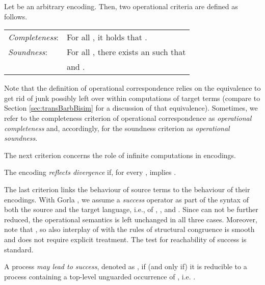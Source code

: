 \documentclass[]{llncs}
\begin{document}
\begin{definition}
\label{def:operationalCorrespondence}
	Let  be an arbitrary encoding.  Then, two operational criteria are defined as follows. 
        \begin{center}
          \begin{tabular}{ll}
            \emph{Completeness}: & For all , it holds that .\\
            \emph{Soundness}: & For all , there exists an  such that\\
            &  and .
          \end{tabular}
        \end{center}
\end{definition}

\noindent
Note that the definition of operational correspondence relies on the
equivalence  to get rid of junk possibly left over within
computations of target terms (compare to Section \ref{sec:transBarbBisim} for a discussion of that equivalence). Sometimes, we refer to the completeness criterion of operational correspondence as \emph{operational completeness} and, accordingly, for the soundness criterion as \emph{operational soundness}.

The next criterion concerns the role of infinite computations in encodings.

\begin{definition}
\label{def:divergenceReflection}
  The encoding  \emph{reflects divergence} if, for every ,  implies .
\end{definition}

\noindent
The last criterion links the behaviour of source terms to the behaviour of their encodings.
With Gorla \cite{gorla10}, we assume a \emph{success} operator  as part of the syntax of both the source and the target language, i.e., of \piMix, \piSep, and \piAsyn. Since  can not be further reduced, the operational semantics is left unchanged in all three cases. Moreover, note that , so also interplay of  with the rules of structural congruence is smooth and does not require explicit treatment. The test for reachability of success is standard.

\begin{definition}[Success]
\label{def:success}
	A process  \emph{may lead to success}, denoted as , if (and only if) it is reducible to a process containing a top-level unguarded occurrence of , i.e. .
\end{definition}
\end{document}
